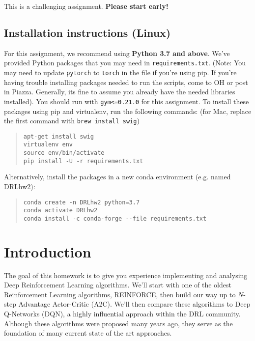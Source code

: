 \documentclass[12pt]{article}
\begin{document}
This is a challenging assignment. \textbf{Please start early!}
\newpage
\subsection*{Installation instructions (Linux)}

For this assignment, we recommend using \textbf{Python 3.7 and above}. We've provided Python packages that you may need in \texttt{requirements.txt}. (Note: You may need to update \texttt{pytorch} to \texttt{torch} in the file if you're using pip. If you're having trouble installing packages needed to run the scripts, come to OH or post in Piazza. Generally, its fine to assume you already have the needed libraries installed). You should run with \texttt{gym<=0.21.0} for this assignment. To install these packages using pip and virtualenv, run the following commands: (for Mac, replace the first command with \texttt{brew install swig})
\begin{quote}
\begin{verbatim}
apt-get install swig
virtualenv env
source env/bin/activate
pip install -U -r requirements.txt
\end{verbatim}
\end{quote}
Alternatively, install the packages in a new conda environment (e.g. named DRLhw2):
\begin{quote}
\begin{verbatim}
conda create -n DRLhw2 python=3.7
conda activate DRLhw2
conda install -c conda-forge --file requirements.txt
\end{verbatim}
\end{quote}



\newpage
\section*{Introduction}
The goal of this homework is to give you experience implementing and analysing Deep Reinforcement Learning algorithms. We'll start with one of the oldest Reinforcement Learning algorithms, REINFORCE, then build our way up to $N$-step Advantage Actor-Critic (A2C). We'll then compare these algorithms to Deep Q-Networks (DQN), a highly influential approach within the DRL community. Although these algorithms were proposed many years ago, they serve as the foundation of many current state of the art approaches.
\end{document}
